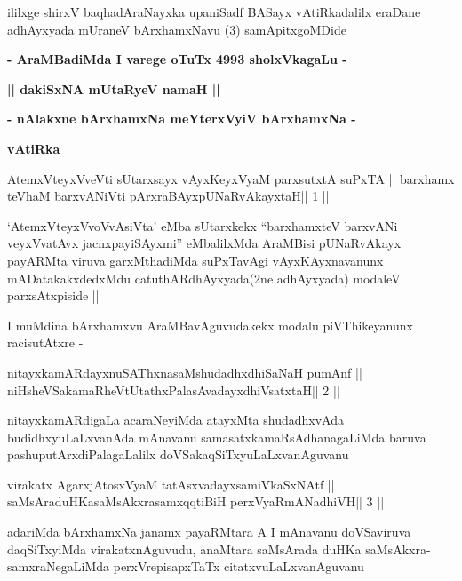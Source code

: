 \begin{center}
ililxge shirxV baqhadAraNayxka upaniSadf BASayx vAtiRkadalilx eraDane
adhAyxyada mUraneV bArxhamxNavu (3) samApitxgoMDide
\end{center}

\begin{center}
\textbf{- AraMBadiMda I varege oTuTx 4993 sholxVkagaLu -}
\end{center}

\begin{center}
\textbf{|| dakiSxNA mUtaRyeV namaH ||}

\textbf{- nAlakxne bArxhamxNa meYterxVyiV bArxhamxNa -}

\textbf{vAtiRka}
\end{center}

\begin{shl}
AtemxVteyxVveVti sUtarxsayx vAyxKeyxVyaM parxsutxtA suPxTA ||
barxhamx teV\s haM barxvANiVti pArxraBAyx\s\s pUNaRvAkayxtaH\hfill || 1 ||
\end{shl}

\begin{artha}
`AtemxVteyxVvoVvAsiVta' eMba sUtarxkekx ``barxhamxteV barxvANi
  veyxVvatAvx jacnxpayiSAyxmi'' eMbalilxMda AraMBisi pUNaRvAkayx
  payARMta viruva garxMthadiMda suPxTavAgi vAyxKAyxnavanunx
  mADatakakxdedxMdu catuthARdhAyxyada(2ne adhAyxyada) modaleV
  parxsAtxpiside ||

I muMdina bArxhamxvu AraMBavAguvudakekx modalu piVThikeyanunx
racisutAtxre -
\end{artha}

\begin{shl}
nitayxkamARdayxnuSAThxnasaMshudadhxdhiSaNaH pumAnf ||
niHsheVSakamaRheVtUtathxPalasAvadayxdhiVsatxtaH\hfill || 2 ||
\end{shl}

\begin{artha}
nitayxkamARdigaLa acaraNeyiMda atayxMta shudadhxvAda
budidhxyuLaLxvanAda mAnavanu samasatxkamaRsAdhanagaLiMda baruva
pashuputArxdiPalagaLalilx doVSakaqSiTxyuLaLxvanAguvanu 
\end{artha}

\begin{shl}
virakatx AgarxjAtosxV\s yaM tatAsxvadayxsamiVkaSxNAtf ||
saMsAraduHKasaMsAkxrasamxqqtiBiH perxVyaRmANadhiVH\hfill || 3 ||
\end{shl}

\begin{artha}
adariMda bArxhamxNa janamx payaRMtara A I mAnavanu doVSaviruva
daqSiTxyiMda virakatxnAguvudu, anaMtara saMsArada duHKa
saMsAkxra-samxraNegaLiMda perxVrepisapxTaTx citatxvuLaLxvanAguvanu 
\end{artha}

